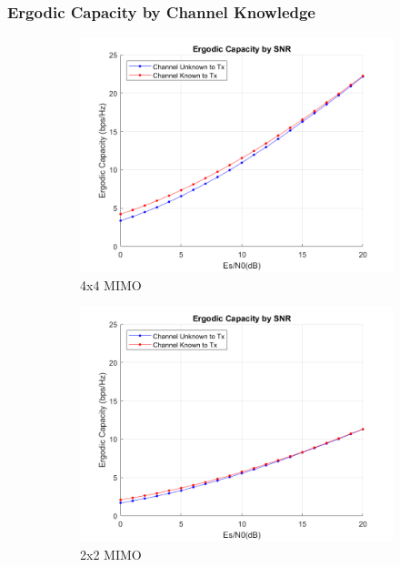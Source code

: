 \documentclass{article}
\begin{document}
\subsubsection{Ergodic Capacity by Channel Knowledge}
\begin{figure}[H]
	\centering
	\begin{subfigure}{0.5\textwidth}
		\centerline{\includegraphics[width=1\textwidth]{c_ergodic.png}}
		\caption{4x4 MIMO}
	\end{subfigure}%
	\begin{subfigure}{0.5\textwidth}
		\centerline{\includegraphics[width=1\textwidth]{c_ergodic_2x2.png}}
		\caption{2x2 MIMO}
	\end{subfigure}\\%
	\caption{}
\end{figure}
\end{document}
